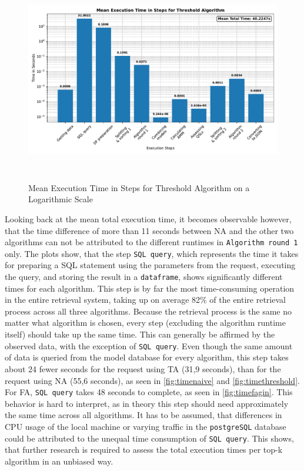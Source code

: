   \begin{figure}[htbp]
    \centering
    \includegraphics[height=9cm]{plots/executiontime_threshold.pdf}
    \caption{Mean Execution Time in Steps for Threshold Algorithm on a Logarithmic Scale}
    \label{fig:timethreshold}
  \end{figure}

Looking back at the mean total execution time, it becomes observable however, that the time difference of more than 11 seconds between NA and the other two algorithms can not be attributed to the different runtimes in \texttt{Algorithm round 1} only. The plots show, that the step \texttt{SQL query}, which represents the time it takes for preparing a SQL statement using the parameters from the request, executing the query, and storing the result in a \texttt{dataframe}, shows significantly different times for each algorithm. This step is by far the most time-consuming operation in the entire retrieval system, taking up on average 82\% of the entire retrieval process across all three algorithms. Because the retrieval process is the same no matter what algorithm is chosen, every step (excluding the algorithm runtime itself) should take up the same time. This can generally be affirmed by the observed data, with the exception of \texttt{SQL query}. Even though the same amount of data is queried from the model database for every algorithm, this step takes about 24 fewer seconds for the request using TA (31,9 seconds), than for the request using NA (55,6 seconds), as seen in \autoref{fig:timenaive} and \autoref{fig:timethreshold}. For FA, \texttt{SQL query} takes 48 seconds to complete, as seen in \autoref{fig:timefagin}. This behavior is hard to interpret, as in theory this step should need approximately the same time across all algorithms. It has to be assumed, that differences in CPU usage of the local machine or varying traffic in the \texttt{postgreSQL} database could be attributed to the unequal time consumption of \texttt{SQL query}. This shows, that further research is required to assess the total execution times per top-k algorithm in an unbiased way. 


